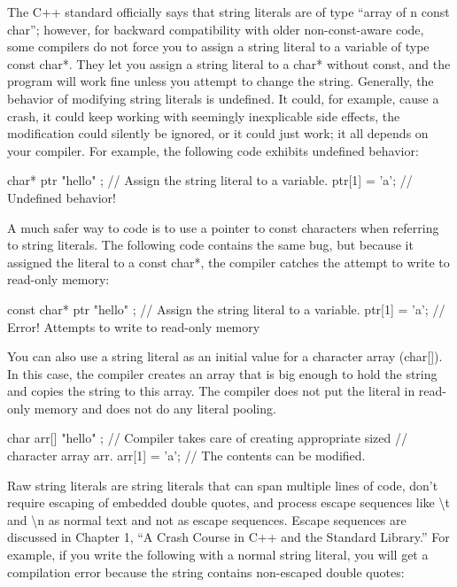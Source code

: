 The C++ standard officially says that string literals are of type “array of n const char”; however, for backward compatibility with older non-const-aware code, some compilers do not force you to assign a string literal to a variable of type const char*. They let you assign a string literal to a char* without const, and the program will work fine unless you attempt to change the string. Generally, the behavior of modifying string literals is undefined. It could, for example, cause a crash, it could keep working with seemingly inexplicable side effects, the modification could silently be ignored, or it could just work; it all depends on your compiler. For example, the following code exhibits undefined behavior:

\begin{cpp}
char* ptr { "hello" }; // Assign the string literal to a variable.
ptr[1] = 'a'; // Undefined behavior!
\end{cpp}

A much safer way to code is to use a pointer to const characters when referring to string literals. The following code contains the same bug, but because it assigned the literal to a const char*, the compiler catches the attempt to write to read-only memory:

\begin{cpp}
const char* ptr { "hello" }; // Assign the string literal to a variable.
ptr[1] = 'a'; // Error! Attempts to write to read-only memory
\end{cpp}

You can also use a string literal as an initial value for a character array (char[]). In this case, the compiler creates an array that is big enough to hold the string and copies the string to this array. The compiler does not put the literal in read-only memory and does not do any literal pooling.

\begin{cpp}
char arr[] { "hello" }; // Compiler takes care of creating appropriate sized
                        // character array arr.
arr[1] = 'a'; // The contents can be modified.
\end{cpp}


Raw string literals are string literals that can span multiple lines of code, don’t require escaping of embedded double quotes, and process escape sequences like \textbackslash{}t and \textbackslash{}n as normal text and not as escape sequences. Escape sequences are discussed in Chapter 1, “A Crash Course in C++ and the Standard Library.” For example, if you write the following with a normal string literal, you will get a compilation error because the string contains non-escaped double quotes:

